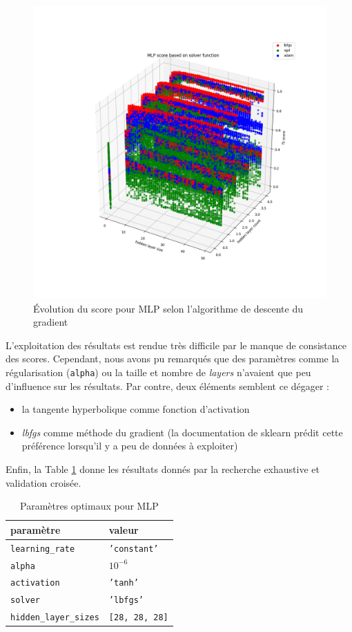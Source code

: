 \documentclass[a4paper]{report}
\begin{document}
\begin{figure}
\centering
\includegraphics[width=\textwidth]{img/mlp_solver.png}
\caption{Évolution du score pour MLP selon l'algorithme de descente du gradient\label{mlp_solver}}
\end{figure}

L'exploitation des résultats est rendue très difficile par le manque de consistance des scores. Cependant, nous avons pu remarqués que des paramètres comme la régularisation (\texttt{alpha}) ou la taille et nombre de \emph{layers} n'avaient que peu d'influence sur les résultats. Par contre, deux éléments semblent ce dégager : \begin{itemize}
\item la tangente hyperbolique comme fonction d'activation
\item \emph{lbfgs} comme méthode du gradient (la documentation de sklearn prédit cette préférence lorsqu'il y a peu de données à exploiter)
\end{itemize}
Enfin, la Table \ref{best_params_mlp} donne les résultats donnés par la recherche exhaustive et validation croisée.

\begin{table}[h]
\centering
\begin{tabular}{ll}
paramètre & valeur \\
\hline
\texttt{learning\_rate} & \texttt{'constant'} \\
\texttt{alpha} & \texttt{$10^{-6}$} \\
\texttt{activation} & \texttt{'tanh'} \\
\texttt{solver} & \texttt{'lbfgs'} \\
\texttt{hidden\_layer\_sizes} & \texttt{[28, 28, 28]}\\
\end{tabular}
\caption{Paramètres optimaux pour MLP\label{best_params_mlp}}
\end{table}
\end{document}
